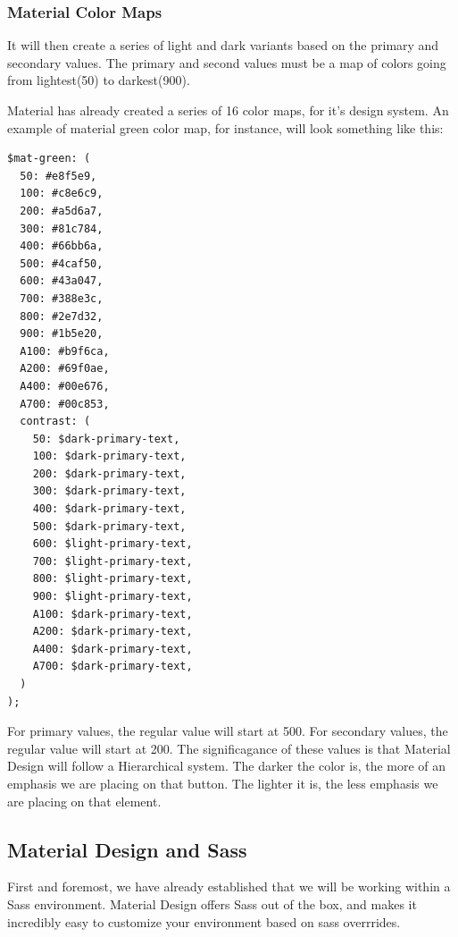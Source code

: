 \subsubsection{Material Color Maps}

It will then create a series of light and dark variants based on the primary 
and secondary values. The primary and second values must be a map of colors 
going from lightest(50) to darkest(900). 

Material has already created a series of 16 color maps, for it's design system. 
An example of material green color map, for instance, will look something like 
this: 
\begin{lstlisting}
$mat-green: (
  50: #e8f5e9,
  100: #c8e6c9,
  200: #a5d6a7,
  300: #81c784,
  400: #66bb6a,
  500: #4caf50,
  600: #43a047,
  700: #388e3c,
  800: #2e7d32,
  900: #1b5e20,
  A100: #b9f6ca,
  A200: #69f0ae,
  A400: #00e676,
  A700: #00c853,
  contrast: (
    50: $dark-primary-text,
    100: $dark-primary-text,
    200: $dark-primary-text,
    300: $dark-primary-text,
    400: $dark-primary-text,
    500: $dark-primary-text,
    600: $light-primary-text,
    700: $light-primary-text,
    800: $light-primary-text,
    900: $light-primary-text,
    A100: $dark-primary-text,
    A200: $dark-primary-text,
    A400: $dark-primary-text,
    A700: $dark-primary-text,
  )
);
\end{lstlisting}

For primary values, the regular value will start at 500. For secondary values, 
the regular value will start at 200. The significagance of these values is that 
Material Design will follow a Hierarchical system. The darker the color is, the 
more of an emphasis we are placing on that button. The lighter it is, the less 
emphasis we are placing on that element. 


\subsection{Material Design and Sass}
First and foremost, we have already established that we will be working within
a Sass environment. Material Design offers Sass out of the box, and makes it 
incredibly easy to customize your environment based on sass overrrides. 

